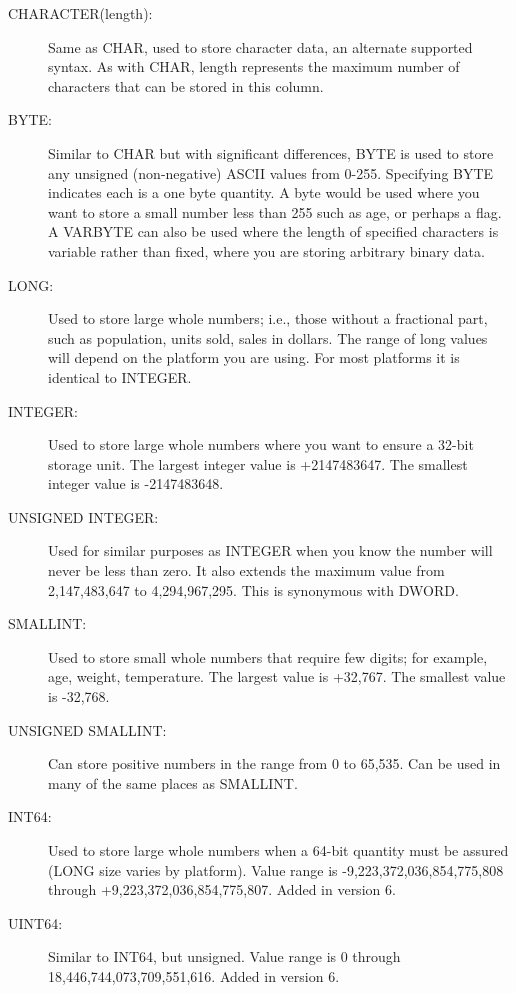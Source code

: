 \begin{description}
\begin{description}
\item[CHARACTER(length):] Same as CHAR, used to store character data,
an alternate supported syntax.  As with CHAR, length represents the
maximum number of characters that can be stored in this column.

\item[BYTE:] Similar to CHAR but with significant differences, BYTE is
used to store any unsigned (non-negative) ASCII values from 0-255.
Specifying BYTE indicates each is a one byte quantity.  A byte would
be used where you want to store a small number less than 255 such as
age, or perhaps a flag.  A VARBYTE can also be used where the length
of specified characters is variable rather than fixed, where you are
storing arbitrary binary data.

\item[LONG:] Used to store large whole numbers; i.e., those without
a fractional part, such as population, units sold, sales in dollars.
The range of long values will depend on the platform you are using.
For most platforms it is identical to INTEGER.

\item[INTEGER:] Used to store large whole numbers where you want to
ensure a 32-bit storage unit.
The largest integer value is +2147483647.  The smallest integer value
is -2147483648.

\item[UNSIGNED INTEGER:] Used for similar purposes as INTEGER when
you know the number will never be less than zero.  It also extends
the maximum value from 2,147,483,647 to 4,294,967,295.  This is
synonymous with DWORD.

\item[SMALLINT:] Used to store small whole numbers that require few
digits; for example, age, weight, temperature.  The largest value is
+32,767.  The smallest value is -32,768.

\item[UNSIGNED SMALLINT:] Can store positive numbers in the range from
0 to 65,535.  Can be used in many of the same places as SMALLINT.

\item[INT64:] Used to store large whole numbers when a 64-bit quantity
must be assured (LONG size varies by platform).  Value range is
-9,223,372,036,854,775,808 through +9,223,372,036,854,775,807.
Added in version 6.

\item[UINT64:] Similar to INT64, but unsigned.  Value range is
0 through 18,446,744,073,709,551,616.  Added in version 6.


\end{description}
\end{description}
